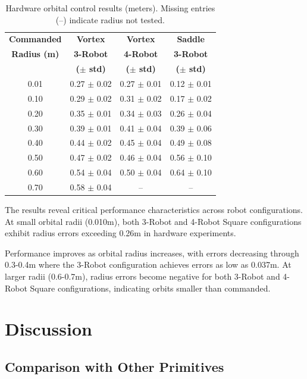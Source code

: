 \documentclass[lettersize,journal]{IEEEtran}
\begin{document}
\begin{table}[h]
    \centering
    \begin{tabular}{cccc}
    \hline
    \textbf{Commanded} & \textbf{Vortex} & \textbf{Vortex} & \textbf{Saddle} \\
    \textbf{Radius (m)} & \textbf{3-Robot} & \textbf{4-Robot} & \textbf{3-Robot} \\
     & \textbf{($\pm$ std)} & \textbf{($\pm$ std)} & \textbf{($\pm$ std)} \\
    \hline
    0.01 & 0.27 $\pm$ 0.02 & 0.27 $\pm$ 0.01 & 0.12 $\pm$ 0.01 \\
    0.10 & 0.29 $\pm$ 0.02 & 0.31 $\pm$ 0.02 & 0.17 $\pm$ 0.02 \\
    0.20 & 0.35 $\pm$ 0.01 & 0.34 $\pm$ 0.03 & 0.26 $\pm$ 0.04 \\
    0.30 & 0.39 $\pm$ 0.01 & 0.41 $\pm$ 0.04 & 0.39 $\pm$ 0.06 \\
    0.40 & 0.44 $\pm$ 0.02 & 0.45 $\pm$ 0.04 & 0.49 $\pm$ 0.08 \\
    0.50 & 0.47 $\pm$ 0.02 & 0.46 $\pm$ 0.04 & 0.56 $\pm$ 0.10 \\
    0.60 & 0.54 $\pm$ 0.04 & 0.50 $\pm$ 0.04 & 0.64 $\pm$ 0.10 \\
    0.70 & 0.58 $\pm$ 0.04 & -- & -- \\
    \hline
    \end{tabular}
    \caption{Hardware orbital control results (meters). Missing entries (--) indicate radius not tested.}
    \label{tab:orbital_radius_comparison}
    \end{table}




The results reveal critical performance characteristics across robot configurations. At small orbital radii (0.010m), both 3-Robot and 4-Robot Square configurations exhibit radius errors exceeding 0.26m in hardware experiments. 

Performance improves as orbital radius increases, with errors decreasing through 0.3-0.4m where the 3-Robot configuration achieves errors as low as 0.037m. At larger radii (0.6-0.7m), radius errors become negative for both 3-Robot and 4-Robot Square configurations, indicating orbits smaller than commanded.




\section{Discussion}

\subsection{Comparison with Other Primitives}
\end{document}
